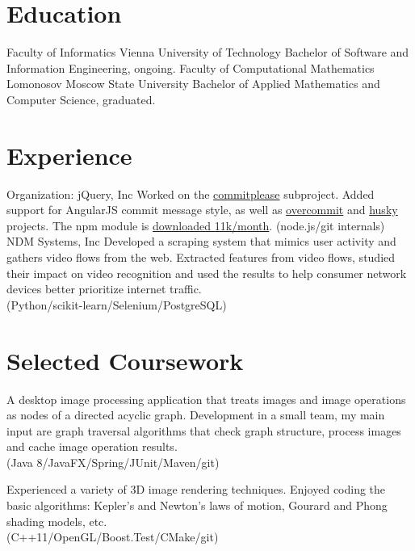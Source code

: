\documentclass[11pt,a4paper,oneside,roman]{moderncv}
\begin{document}
\makecvtitle

\section{Education}
        {Faculty of Informatics}
        {Vienna University of Technology}
        {}{}
        {Bachelor of Software and Information Engineering, ongoing.}
        {Faculty of Computational Mathematics}
        {Lomonosov Moscow State University}
        {}{}
        {Bachelor of Applied Mathematics and Computer Science, graduated.}
\section{Experience}
        {Organization: jQuery, Inc}{}
        {}{Worked on the \href{https://github.com/jzaefferer/commitplease/}{commitplease} subproject. Added support for AngularJS commit message style, as well as \href{https://github.com/brigade/overcommit}{overcommit} and \href{https://github.com/typicode/husky}{husky} projects. The npm module is \href{https://www.npmjs.com/package/commitplease}{downloaded 11k/month}. (node.js/git internals)}
        {NDM Systems, Inc}
        {}{}
        {Developed a scraping system that mimics user activity and gathers video flows from the web. Extracted features from video flows, studied their impact on video recognition and used the results to help consumer network devices better prioritize internet traffic. \\ (Python/scikit-learn/Selenium/PostgreSQL)}

\section{Selected Coursework}
        {}{}{}{A desktop image processing application that treats images and image operations as nodes of a directed acyclic graph. Development in a small team, my main input are graph traversal algorithms that check graph structure, process images and cache image operation results. \\ (Java 8/JavaFX/Spring/JUnit/Maven/git)}

        {}{}{}{Experienced a variety of 3D image rendering techniques. Enjoyed coding the basic algorithms: Kepler's and Newton's laws of motion, Gourard and Phong shading models, etc. \\ (C++11/OpenGL/Boost.Test/CMake/git)}
\end{document}
